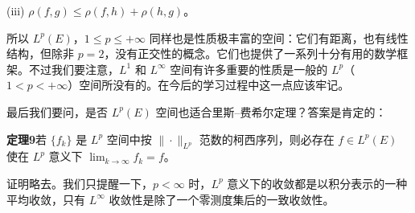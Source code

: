 (iii) $\rho(f,g)\le\rho(f,h)+\rho(h,g)$。

所以 $L^p(E)$，$1\le p\le+\infty$ 同样也是性质极丰富的空间：它们有距离，也有线性结构，但除非 $p=2$，没有正交性的概念。它们也提供了一系列十分有用的数学框架。不过我们要注意，$L^1$ 和 $L^\infty$ 空间有许多重要的性质是一般的 $L^p$（$1<p<+\infty$）空间所没有的。在今后的学习过程中这一点应该牢记。

最后我们要问，是否 $L^p(E)$ 空间也适合里斯--费希尔定理？答案是肯定的：

\noindent\textbf{定理9}\quad 若 $\{f_k\}$ 是 $L^p$ 空间中按 $\|\cdot\|_{L^p}$ 范数的柯西序列，则必存在 $f\in L^p(E)$ 使在 $L^p$ 意义下 $\lim_{k\to\infty}f_k=f$。

证明略去。我们只提醒一下，$p<\infty$ 时，$L^p$ 意义下的收敛都是以积分表示的一种平均收敛，只有 $L^\infty$ 收敛性是除了一个零测度集后的一致收敛性。
